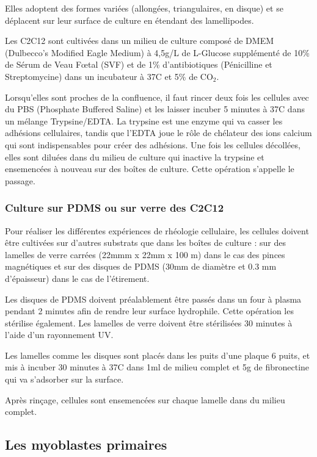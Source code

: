 	Elles adoptent des formes variées (allongées, triangulaires, en disque) et se déplacent sur leur surface de culture en étendant des lamellipodes. 
	
	Les C2C12 sont cultivées dans un milieu de culture composé de DMEM (Dulbecco's Modified Eagle Medium) à 4,5g/L de L-Glucose supplémenté de 10\% de Sérum de Veau F\oe tal (SVF) et de 1\% d'antibiotiques (Pénicilline et Streptomycine) dans un incubateur à 37\degres   C et 5\% de CO$_2$. 
	
	
	Lorsqu'elles sont proches de la confluence, il faut rincer deux fois les cellules avec du PBS (Phosphate Buffered Saline) et les laisser incuber 5 minutes à 37\degres   C dans un mélange Trypsine/EDTA. La trypsine est une enzyme qui va casser les adhésions cellulaires, tandis que l'EDTA joue le rôle de chélateur des ions calcium qui sont indispensables pour créer des adhésions. Une fois les cellules décollées, elles sont diluées dans du milieu de culture qui inactive la trypsine et ensemencées à nouveau sur des boîtes de culture. Cette opération s'appelle le passage. 
	 
	\subsubsection{Culture sur PDMS ou sur verre des C2C12 \label{Coating}}

	Pour réaliser les différentes expériences de rhéologie cellulaire, les cellules doivent être cultivées sur d'autres substrats que dans les boîtes de culture : sur des lamelles de verre carrées (22mmm x 22mm x 100 \micro m) dans le cas des pinces magnétiques et sur des disques de PDMS (30mm de diamètre et 0.3 mm d'épaisseur) dans le cas de l'étirement. 
	
	Les disques de PDMS doivent préalablement être passés dans un four à plasma pendant 2 minutes afin de rendre leur surface hydrophile. Cette opération les stérilise également. Les lamelles de verre doivent être stérilisées 30 minutes à l'aide d'un rayonnement UV. 
	
	Les lamelles comme les disques sont placés dans les puits d'une plaque 6 puits, et mis à incuber 30 minutes à 37\degres   C dans 1ml de milieu complet et 5\micro g de fibronectine qui va s'adsorber sur la surface. 
	
	Après rinçage,  cellules sont ensemencées sur chaque lamelle dans du milieu complet. 
	
	\subsection{Les myoblastes primaires}
	
